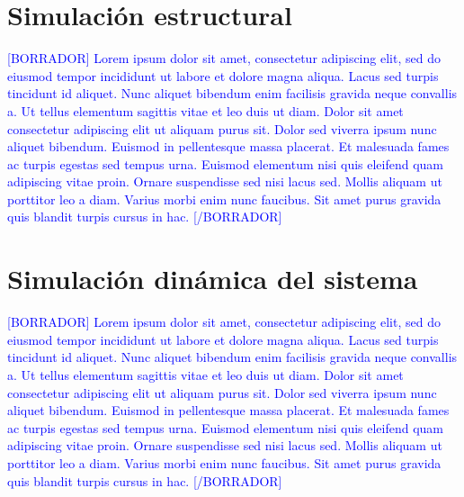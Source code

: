 
\section{Simulación estructural}
		

\textcolor{blue}{[BORRADOR] Lorem ipsum dolor sit amet, consectetur adipiscing elit, sed do eiusmod tempor incididunt ut labore et dolore magna aliqua. Lacus sed turpis tincidunt id aliquet. Nunc aliquet bibendum enim facilisis gravida neque convallis a. Ut tellus elementum sagittis vitae et leo duis ut diam. Dolor sit amet consectetur adipiscing elit ut aliquam purus sit. Dolor sed viverra ipsum nunc aliquet bibendum. Euismod in pellentesque massa placerat. Et malesuada fames ac turpis egestas sed tempus urna. Euismod elementum nisi quis eleifend quam adipiscing vitae proin. Ornare suspendisse sed nisi lacus sed. Mollis aliquam ut porttitor leo a diam. Varius morbi enim nunc faucibus. Sit amet purus gravida quis blandit turpis cursus in hac. [/BORRADOR]} 


\section{Simulación dinámica del sistema}

\textcolor{blue}{[BORRADOR] Lorem ipsum dolor sit amet, consectetur adipiscing elit, sed do eiusmod tempor incididunt ut labore et dolore magna aliqua. Lacus sed turpis tincidunt id aliquet. Nunc aliquet bibendum enim facilisis gravida neque convallis a. Ut tellus elementum sagittis vitae et leo duis ut diam. Dolor sit amet consectetur adipiscing elit ut aliquam purus sit. Dolor sed viverra ipsum nunc aliquet bibendum. Euismod in pellentesque massa placerat. Et malesuada fames ac turpis egestas sed tempus urna. Euismod elementum nisi quis eleifend quam adipiscing vitae proin. Ornare suspendisse sed nisi lacus sed. Mollis aliquam ut porttitor leo a diam. Varius morbi enim nunc faucibus. Sit amet purus gravida quis blandit turpis cursus in hac. [/BORRADOR]} 


